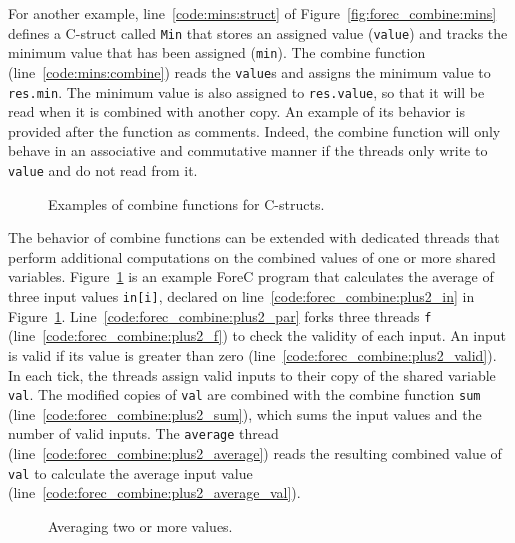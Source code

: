 For another example, line~\ref{code:mins:struct} of
Figure~\ref{fig:forec_combine:mins} defines a C-struct
called \texttt{Min} that stores an assigned value
(\verb$value$) and tracks the minimum value that has
been assigned (\verb$min$). The combine function
(line~\ref{code:mins:combine}) reads the 
\texttt{value}s and assigns the minimum 
value to \texttt{res.min}. The minimum value is also 
assigned to \texttt{res.value},
so that it will be read when it is combined with another copy.
An example of its behavior is provided after the function as
comments. Indeed, the combine function will only behave in
an associative and commutative manner if the threads only
write to \verb$value$ and do not read from it.


\begin{figure}
	\centering

	

	\caption{Examples of combine functions for C-structs.}
\end{figure}

The behavior of combine functions can be extended with 
dedicated threads that perform additional computations on the 
combined values of one or more shared variables.
Figure~\ref{fig:forec_combine:plus2} is an example ForeC
program that calculates the average of three input
values \texttt{in[i]}, declared on line~\ref{code:forec_combine:plus2_in} 
in Figure~\ref{fig:forec_combine:plus2}. Line~\ref{code:forec_combine:plus2_par} 
forks three threads \texttt{f} (line~\ref{code:forec_combine:plus2_f}) 
to check the validity of each 
input. An input is valid if its value is greater than zero 
(line~\ref{code:forec_combine:plus2_valid}). In each tick, the threads 
assign valid inputs to their copy of the shared variable \texttt{val}.
The modified copies of \texttt{val} are combined with the 
combine function \texttt{sum} (line~\ref{code:forec_combine:plus2_sum}), 
which sums the input values and the number of valid inputs. 
The \texttt{average} thread (line~\ref{code:forec_combine:plus2_average}) 
reads the resulting combined value of \texttt{val} to calculate the 
average input value (line~\ref{code:forec_combine:plus2_average_val}).

\begin{figure}
	\centering

	\begin{minipage}[b]{0.8\textwidth}
		
		\label{fig:forec_combine:plus2}
	\end{minipage}
	
	\caption{Averaging two or more values.}
\end{figure}
